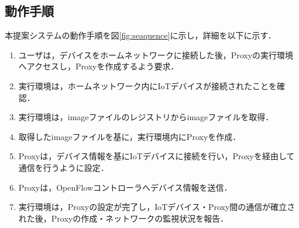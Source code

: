 \documentclass[Japanese]{dicomopapers}
\begin{document}
\subsection{動作手順}
本提案システムの動作手順を図\ref{fig:seaquence}に示し，詳細を以下に示す．
\begin{enumerate}
	\item ユーザは，デバイスをホームネットワークに接続した後，Proxyの実行環境へアクセスし，Proxyを作成するよう要求．
	\item 実行環境は，ホームネットワーク内にIoTデバイスが接続されたことを確認．
	\item 実行環境は，imageファイルのレジストリからimageファイルを取得．
	\item 取得したimageファイルを基に，実行環境内にProxyを作成．
	\item Proxyは，デバイス情報を基にIoTデバイスに接続を行い，Proxyを経由して通信を行うように設定．
	\item Proxyは，OpenFlowコントローラへデバイス情報を送信．
	\item 実行環境は，Proxyの設定が完了し，IoTデバイス・Proxy間の通信が確立された後，Proxyの作成・ネットワークの監視状況を報告．
\end{enumerate}



\end{document}
